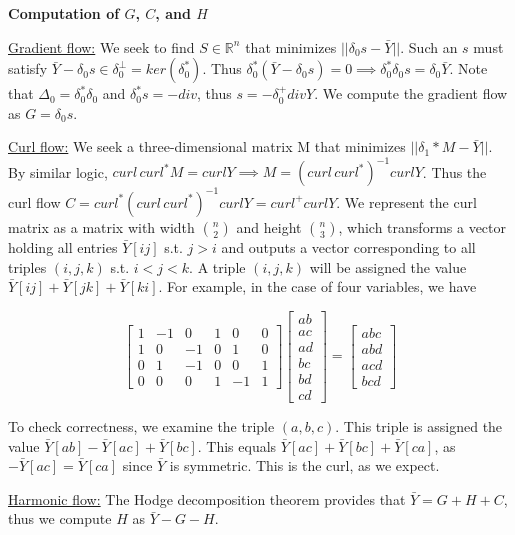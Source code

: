 \documentclass{article}
\begin{document}
\bigskip
\noindent\textbf{Computation of $G$, $C$, and $H$}
\bigskip

\underline{Gradient flow:}
We seek to find $S \in \mathbb{R}^n$ that minimizes $\lvert\lvert \delta_0s - \bar{Y} \rvert\rvert$.
Such an $s$ must satisfy $\bar{Y} - \delta_0s \in \delta_0^\perp = ker(\delta_0^*)$.
Thus $\delta_0^*(\bar{Y} - \delta_0s) = 0 \implies \delta_0^* \delta_0 s = \delta_0 \bar{Y}$.
Note that $\Delta_0 = \delta_0^* \delta_0$ and $\delta_0^* s = -div$, thus $s = -\delta_0^+divY$.
We compute the gradient flow as $G = \delta_0s$.

\bigskip

\underline{Curl flow:}
We seek a three-dimensional matrix M that minimizes $\lvert\lvert \delta_1*M - \bar{Y} \rvert\rvert$.
By similar logic, $curl \, curl^*M = curlY \implies M = (curl \, curl^*)^{-1} curl Y$.
Thus the curl flow $C = curl^* (curl \, curl^*)^{-1} curl Y = curl^+ curlY$.
We represent the curl matrix as a matrix with width $\binom{n}{2}$ and height $\binom{n}{3}$,
which transforms a vector holding all entries $\bar{Y}[ij]$ s.t. $j>i$ and outputs a vector corresponding to all triples $(i,j,k)$ s.t. $i<j<k$.
A triple $(i,j,k)$ will be assigned the value $\bar{Y}[ij] + \bar{Y}[jk] + \bar{Y}[ki]$.
For example, in the case of four variables, we have 

\[
  \begin{bmatrix}
    1 & -1 & 0 & 1 & 0 & 0 \\
    1 & 0 & -1 & 0 & 1 & 0 \\
    0 & 1 & -1 & 0 & 0 & 1 \\
    0 & 0 & 0 & 1 & -1 & 1
  \end{bmatrix}
  \begin{bmatrix}
    ab \\ ac \\ ad \\ bc \\ bd \\ cd
  \end{bmatrix}
  =
  \begin{bmatrix}
    abc \\ abd \\ acd \\ bcd
  \end{bmatrix}
\]

To check correctness, we examine the triple $(a,b,c)$.
This triple is assigned the value $\bar{Y}[ab] - \bar{Y}[ac] + \bar{Y}[bc]$.
This equals $\bar{Y}[ac] + \bar{Y}[bc] + \bar{Y}[ca]$, as $- \bar{Y}[ac] = \bar{Y}[ca]$ since $\bar{Y}$ is symmetric.
This is the curl, as we expect.

\bigskip

\underline{Harmonic flow:}
The Hodge decomposition theorem provides that $\bar{Y} = G + H + C$, thus we compute $H$ as $\bar{Y} - G - H$.

\bigskip
{}
\bigskip

\bigskip
{}
\bigskip
\end{document}
